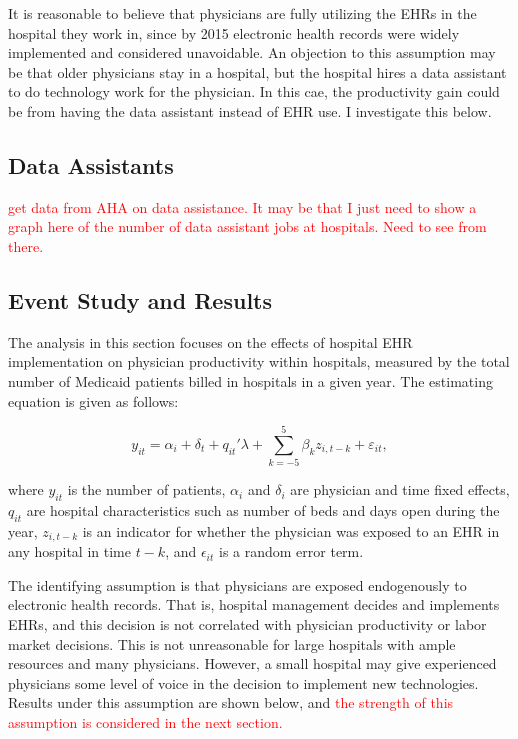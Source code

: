 \documentclass[11pt]{article}
\begin{document}
It is reasonable to believe that physicians are fully utilizing the EHRs in the hospital they work in, since by 2015 electronic health records were widely implemented and considered unavoidable. An objection to this assumption may be that older physicians stay in a hospital, but the hospital hires a data assistant to do technology work for the physician. In this cae, the productivity gain could be from having the data assistant instead of EHR use. I investigate this below.

\subsection{Data Assistants}

\textcolor{red}{get data from AHA on data assistance. It may be that I just need to show a graph here of the number of data assistant jobs at hospitals. Need to see from there. }

\subsection{Event Study and Results}

The analysis in this section focuses on the effects of hospital EHR implementation on physician productivity within hospitals, measured by the total number of Medicaid patients billed in hospitals in a given year. The estimating equation is given as follows: 

\begin{equation*}
    y_{it}=\alpha_i+\delta_t+q_{it}'\lambda+\sum_{k=-5}^5 \beta_kz_{i,t-k} + \varepsilon_{it},
\end{equation*}

where $y_{it}$ is the number of patients, $\alpha_i$ and $\delta_i$ are physician and time fixed effects, $q_{it}$ are hospital characteristics such as number of beds and days open during the year, $z_{i,t-k}$ is an indicator for whether the physician was exposed to an EHR in any hospital in time $t-k$, and $\epsilon_{it}$ is a random error term. 

The identifying assumption is that physicians are exposed endogenously to electronic health records. That is, hospital management decides and implements EHRs, and this decision is not correlated with physician productivity or labor market decisions. This is not unreasonable for large hospitals with ample resources and many physicians. However, a small hospital may give experienced physicians some level of voice in the decision to implement new technologies. Results under this assumption are shown below, and  \textcolor{red}{the strength of this assumption is considered in the next section. } 
\end{document}
